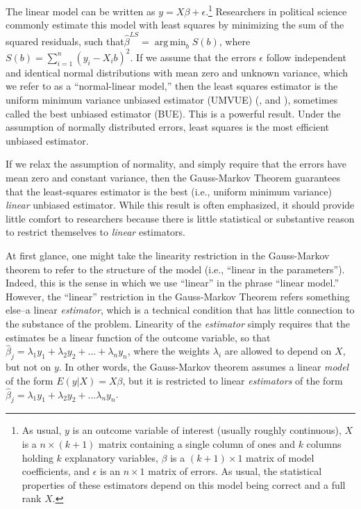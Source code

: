 \documentclass[12pt]{article}
\DeclareMathOperator*{\argmin}{arg\,min}
\begin{document}
The linear model can be written as $y = X\beta + \epsilon$.\footnote{As usual, $y$ is an outcome variable of interest (usually roughly continuous), $X$ is a $n \times (k + 1)$ matrix containing a single column of ones and $k$ columns holding $k$ explanatory variables, $\beta$ is a $(k + 1) \times 1$ matrix of model coefficients, and $\epsilon$ is an $n \times 1$ matrix of errors. As usual, the statistical properties of these estimators depend on this model being correct and a full rank $X$.} 
Researchers in political science commonly estimate this model with least squares by minimizing the sum of the squared residuals, such that$\hat{\beta}^{LS} = \argmin_b S(b)$, where $S(b) = \sum_{i = 1}^n(y_i - X_ib)^2$. 
If we assume that the errors $\epsilon$ follow independent and identical normal distributions with mean zero and unknown variance, which we refer to as a ``normal-linear model,'' then the least squares estimator is the uniform minimum variance unbiased estimator (UMVUE) (\citealt[pp. 334-342]{CasellaBerger2002}, and \citealt[807-815]{Wooldridge2013}), sometimes called the best unbiased estimator (BUE).
This is a powerful result. 
Under the assumption of normally distributed errors, least squares is the most efficient unbiased estimator.

If we relax the assumption of normality, and simply require that the errors have mean zero and constant variance, then the Gauss-Markov Theorem guarantees that the least-squares estimator is the best (i.e., uniform minimum variance) \textit{linear} unbiased estimator. 
While this result is often emphasized, it should provide little comfort to researchers because there is little statistical or substantive reason to restrict themselves to \textit{linear} estimators.

At first glance, one might take the linearity restriction in the Gauss-Markov theorem to refer to the structure of the model (i.e., ``linear in the parameters''). 
Indeed, this is the sense in which we use ``linear'' in the phrase ``linear model.'' 
However, the ``linear'' restriction in the Gauss-Markov Theorem refers something else--a linear \textit{estimator}, which is a technical condition that has little connection to the substance of the problem.
Linearity of the \textit{estimator} simply requires that the estimates be a linear function of the outcome variable, so that $\hat{\beta}_j = \lambda_1 y_1 + \lambda_2 y_2 + ... + \lambda_n y_n$, where the weights $\lambda_i$ are allowed to depend on $X$, but not on $y$. 
In other words, the Gauss-Markov theorem assumes a linear \textit{model} of the form $E(y | X) = X\beta$, but it is restricted to linear \textit{estimators} of the form $\hat{\beta}_j = \lambda_1 y_1 + \lambda_2 y_2 + ... \lambda_n y_n$. 
\end{document}
